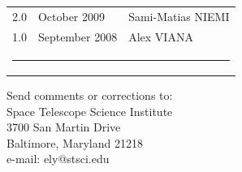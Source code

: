 \begin{titlepage}
\begin{table}[h]
\begin{tabular}{lll}
      2.0                 &  October 2009  & Sami-Matias NIEMI  \\ 
      1.0                 &  September 2008  & Alex VIANA  \\ 
 
 
 \multicolumn{3}{c}{ \rule{130mm}{0.8mm}}      \\    
\end{tabular}
\end{table}%


\vspace{120mm}

\begin{flushright}
Send comments or corrections to: \\
Space Telescope Science Institute \\
3700 San Martin Drive \\
Baltimore, Maryland 21218 \\
e-mail: ely@stsci.edu
 \end{flushright}
\end{titlepage}

